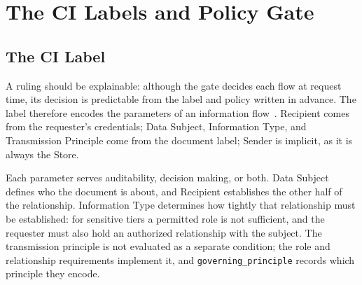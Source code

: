 \section{The CI Labels and Policy Gate}
\label{sec:system_arch}

\subsection{The CI Label}
\label{sec:label}
A ruling should be explainable: although the gate decides each flow at request
time, its decision is predictable from the label and policy written in advance.
The label therefore encodes the parameters of an information
flow~\cite{nissenbaum}. Recipient comes from the requester's credentials; Data
Subject, Information Type, and Transmission Principle come from the document
label; Sender is implicit, as it is always the Store.

\begin{table}[t]
\centering
\caption{Fields of the document label that constrain each Contextual Integrity
parameter.}
\label{tab:ci-mapping}
\footnotesize
{}
\end{table}

Each parameter serves auditability, decision making, or both. Data Subject
defines who the document is about, and Recipient establishes the other half of
the relationship. Information Type determines how tightly that relationship
must be established: for sensitive tiers a permitted role is not sufficient,
and the requester must also hold an authorized relationship with the subject.
The transmission principle is not evaluated as a separate condition; the role
and relationship requirements implement it, and \texttt{governing\_principle}
records which principle they encode.

